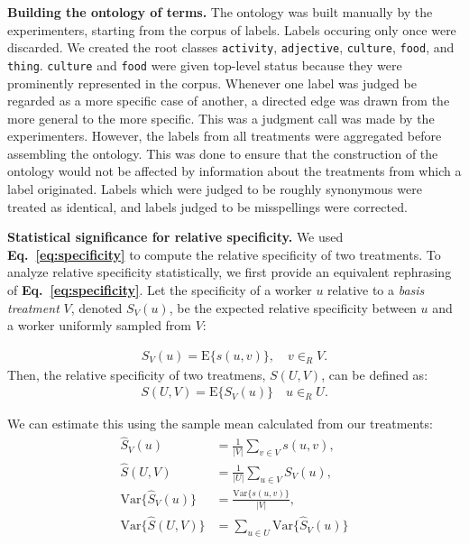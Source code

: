 \documentclass[a4paper]{report}
\begin{document}
\textbf{Building the ontology of terms.}  The ontology was built manually
by the experimenters, starting from the corpus of labels. Labels occuring only 
once were discarded.  We created the root classes \texttt{activity}, 
\texttt{adjective}, \texttt{culture}, 
\texttt{food}, and \texttt{thing}. \texttt{culture} and \texttt{food} were 
given top-level status because they were prominently represented in the corpus.
Whenever one label was judged be regarded as a more specific case of another, a
directed edge was drawn from the more general to the more specific. This was a 
judgment call was made by the experimenters.  However, the labels from all 
treatments were aggregated before assembling the ontology.  This was done to 
ensure that the construction of the ontology would not be affected by 
information about the treatments from which a label originated. 
Labels which were judged to be roughly synonymous were treated as identical,
and labels judged to be misspellings were corrected. 

\textbf{Statistical significance for relative specificity.}
We used \textbf{Eq.~\ref{eq:specificity}} to compute the relative specificity
of two treatments.  To analyze relative specificity statistically,
we first provide an equivalent rephrasing of \textbf{Eq.~\ref{eq:specificity}}.
Let the specificity of a worker $u$ relative to a 
\textit{basis treatment} $V$, denoted $S_V(u)$, be the expected relative 
specificity between $u$ and a worker uniformly sampled from $V$:

\begin{align}
	S_V(u) =  \text{E}\{s(u,v)\}, \quad v \in_R V.
\end{align}
Then, the relative specificity of two treatmens, $S(U,V)$, can be defined as:
\begin{align}
	S(U,V) = \text{E}\{S_V(u)\} \quad u \in_R U.
\end{align}

We can estimate this using the sample mean calculated from our treatments:
\begin{align}
	\hat{S}_V(u) &= \frac{1}{|V|} \sum_{v \in V} s(u,v), \\
	\hat{S}(U,V) &= \frac{1}{|U|} \sum_{u \in V} S_V(u), \\
	\text{Var}\{\hat{S}_V(u)\} &= \frac{\text{Var}\{s(u,v)\}}{|V|},\\
	\text{Var}\{\hat{S}(U,V)\} &= \sum_{u\in U}\text{Var}\{\hat{S}_V(u)\}
\end{align}
\end{document}

